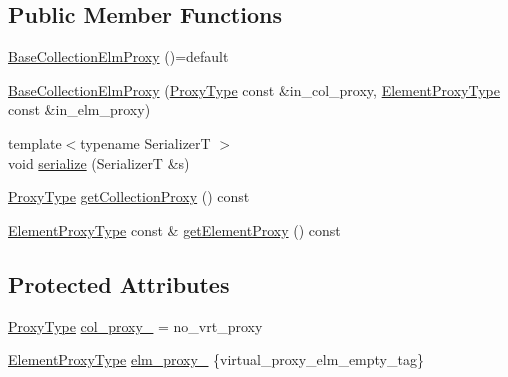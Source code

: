 \subsection*{Public Member Functions}
\begin{DoxyCompactItemize}
\item 
\hyperlink{structvt_1_1vrt_1_1collection_1_1_base_collection_elm_proxy_a8cc789eb47c9bdc35639eda026074037}{Base\+Collection\+Elm\+Proxy} ()=default
\item 
\hyperlink{structvt_1_1vrt_1_1collection_1_1_base_collection_elm_proxy_a5411fb2f681b49e17c2c4f793ccbafea}{Base\+Collection\+Elm\+Proxy} (\hyperlink{structvt_1_1vrt_1_1collection_1_1_base_collection_elm_proxy_a1a60a46fe46552edfaf5c8785e283615}{Proxy\+Type} const \&in\+\_\+col\+\_\+proxy, \hyperlink{structvt_1_1vrt_1_1collection_1_1_base_collection_elm_proxy_aeb2058caef8c935a8a88654787672305}{Element\+Proxy\+Type} const \&in\+\_\+elm\+\_\+proxy)
\item 
{\footnotesize template$<$typename SerializerT $>$ }\\void \hyperlink{structvt_1_1vrt_1_1collection_1_1_base_collection_elm_proxy_a0434fa3700f8059d745454dcd6cb7f4c}{serialize} (SerializerT \&s)
\item 
\hyperlink{structvt_1_1vrt_1_1collection_1_1_base_collection_elm_proxy_a1a60a46fe46552edfaf5c8785e283615}{Proxy\+Type} \hyperlink{structvt_1_1vrt_1_1collection_1_1_base_collection_elm_proxy_abf6583c0a59d86b1f1d04ca04da5d8af}{get\+Collection\+Proxy} () const
\item 
\hyperlink{structvt_1_1vrt_1_1collection_1_1_base_collection_elm_proxy_aeb2058caef8c935a8a88654787672305}{Element\+Proxy\+Type} const  \& \hyperlink{structvt_1_1vrt_1_1collection_1_1_base_collection_elm_proxy_ab0399248efc4076a2010e2839ecd601f}{get\+Element\+Proxy} () const
\end{DoxyCompactItemize}
\subsection*{Protected Attributes}
\begin{DoxyCompactItemize}
\item 
\hyperlink{structvt_1_1vrt_1_1collection_1_1_base_collection_elm_proxy_a1a60a46fe46552edfaf5c8785e283615}{Proxy\+Type} \hyperlink{structvt_1_1vrt_1_1collection_1_1_base_collection_elm_proxy_ac21134fb596c40afa2011b871f0f6795}{col\+\_\+proxy\+\_\+} = no\+\_\+vrt\+\_\+proxy
\item 
\hyperlink{structvt_1_1vrt_1_1collection_1_1_base_collection_elm_proxy_aeb2058caef8c935a8a88654787672305}{Element\+Proxy\+Type} \hyperlink{structvt_1_1vrt_1_1collection_1_1_base_collection_elm_proxy_ae171e496a7240dd9c30bbd5d7fc890f0}{elm\+\_\+proxy\+\_\+} \{virtual\+\_\+proxy\+\_\+elm\+\_\+empty\+\_\+tag\}
\end{DoxyCompactItemize}


